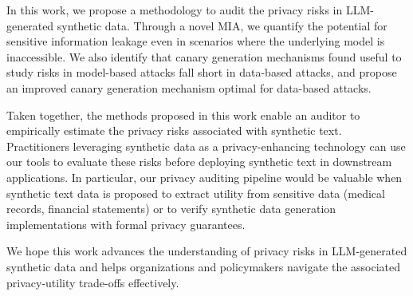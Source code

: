 
In this work, we propose a methodology to audit the privacy risks in LLM-generated synthetic data. Through a novel MIA, we quantify the potential for sensitive information leakage even in scenarios where the underlying model is inaccessible. We also identify that canary generation mechanisms found useful to study risks in model-based attacks fall short in data-based attacks, and propose an improved canary generation mechanism optimal for data-based attacks. 

Taken together, the methods proposed in this work enable an auditor to empirically estimate the privacy risks associated with synthetic text. Practitioners leveraging synthetic data as a privacy-enhancing technology can use our tools to evaluate these risks before deploying synthetic text in downstream applications. In particular, our privacy auditing pipeline would be valuable when synthetic text data is proposed to extract utility from sensitive data (\eg medical records, financial statements) or to verify synthetic data generation implementations with formal privacy guarantees. 

We hope this work advances the understanding of privacy risks in LLM-generated synthetic data and helps organizations and policymakers navigate the associated privacy-utility trade-offs effectively. 
